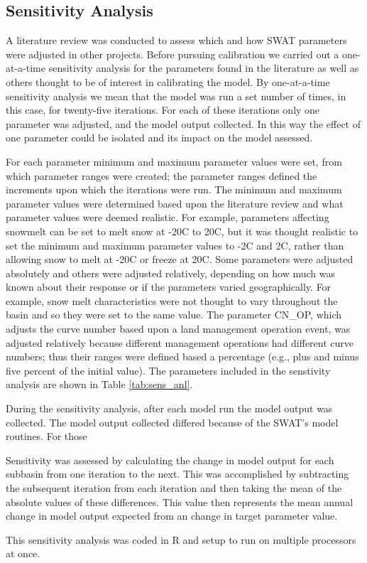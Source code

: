 \subsection{Sensitivity Analysis}
	A literature review was conducted to assess which and how SWAT parameters were adjusted in other projects. Before pursuing calibration we carried out a one-at-a-time sensitivity analysis for the parameters found in the literature as well as others thought to be of interest in calibrating the model. By one-at-a-time sensitivity analysis we mean that the model was run a set number of times, in this case, for twenty-five iterations. For each of these iterations only one parameter was adjusted, and the model output collected. In this way the effect of one parameter could be isolated and its impact on the model assessed. 

	For each parameter minimum and maximum parameter values were set, from which parameter ranges were created; the parameter ranges defined the increments upon which the iterations were run. The minimum and maximum parameter values were determined based upon the literature review and what parameter values were deemed realistic. For example, parameters affecting snowmelt can be set to melt snow at -20\degree C  to 20\degree C, but it was thought realistic to set the minimum and maximum parameter values to -2\degree C  and 2\degree C, rather than allowing snow to melt at -20\degree C  or freeze at 20\degree C. Some parameters were adjusted absolutely and others were adjusted relatively, depending on how much was known about their response or if the parameters varied geographically. For example, snow melt characteristics were not thought to vary throughout the basin and so they were set to the same value. The parameter CN\_OP, which adjusts the curve number based upon a land management operation event, was adjusted relatively because different management operations had different curve numbers; thus their ranges were defined based a percentage (e.g., plus and minus five percent of the initial value). The parameters included in the senstivity analysis are shown in Table \ref{tab:sens_anl}. 

	During the sensitivity analysis, after each model run the model output was collected. The model output collected differed because of the SWAT's model routines. For those 
	
	Sensitivity was assessed by calculating the change in model output for each subbasin from one iteration to the next. This was accomplished by subtracting the subsequent iteration from each iteration and then taking the mean of the absolute values of these differences. This value then represents the mean annual change in model output expected from an change in target parameter value. 

	This sensitivity analysis was coded in R and setup to run on multiple processors at once.

\pagebreak
